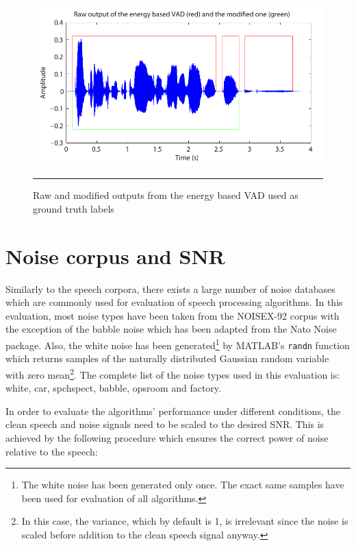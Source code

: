 \begin{figure}[htbp]
	\centering
		\includegraphics[width=0.9\columnwidth]{Figures/Chapter3/groundtruth.pdf}
		\rule{37em}{0.5pt}
	\caption[Raw and modified outputs from the energy based VAD used as ground truth labels]{Raw and modified outputs from the energy based VAD used as ground truth labels}
	\label{fig:groundtruth}
\end{figure}


\section{Noise corpus and SNR}

Similarly to the speech corpora, there exists a large number of noise databases which are commonly used for evaluation of speech processing algorithms. In this evaluation, most noise types have been taken from the NOISEX-92 \cite{NOISEX} corpus with the exception of the babble noise which has been adapted from the Nato Noise \cite{Nato} package. Also, the white noise has been generated\footnote{The white noise has been generated only once. The exact same samples have been used for evaluation of all algorithms.} by MATLAB's \texttt{randn} function which returns samples of the naturally distributed Gaussian random variable with zero mean\footnote{In this case, the variance, which by default is 1, is irrelevant since the noise is scaled before addition to the clean speech signal anyway.}. The complete list of the noise types used in this evaluation is: white, car, spchspect, babble, opsroom and factory.

In order to evaluate the algorithms' performance under different conditions, the clean speech and noise signals need to be scaled to the desired SNR. This is achieved by the following procedure which ensures the correct power of noise relative to the speech:

